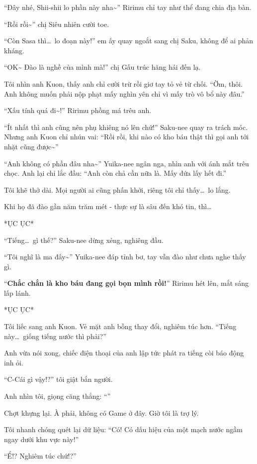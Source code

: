 \documentclass[../main.tex]{subfiles}
\begin{document}
``Đây nhé, Shii-shii lo phần này nha\~{}'' Ririmu chỉ tay như thể đang chia địa bàn.

``Rồi rồi\~{}'' chị Siêu nhiên cười toe.

``Còn Sasa thì\dots\ lo đoạn này!'' em ấy quay ngoắt sang chị Saku, không để ai phản kháng.

``OK\~{} Đào là nghề của mình mà!'' chị Gấu trúc hăng hái đến lạ.

Tôi nhìn anh Kuon, thấy anh chỉ cười trừ rồi giơ tay tỏ vẻ từ chối. ``Ờm, thôi. Anh không muốn phải nộp phạt mấy nghìn yên chỉ vì mấy trò vô bổ này đâu.''

``Xấu tính quá đi\~{}!'' Ririmu phồng má trêu anh.

``Ít nhất thì anh cũng nên phụ khiêng nó lên chứ!'' Saku-nee quay ra trách móc. Nhưng anh Kuon chỉ nhún vai: ``Rồi rồi, khi nào có kho báu thật thì gọi anh tới nhặt cũng được\~{}''

``Anh không có phần đâu nha\~{}'' Yuika-nee ngân nga, nhìn anh với ánh mắt trêu chọc. Anh lại chỉ lắc đầu: ``Anh còn chả cần nữa là. Mấy đứa lấy hết đi.''

Tôi khẽ thở dài. Mọi người ai cũng phấn khởi, riêng tôi chỉ thấy\dots\ lo lắng.

Khi họ đã đào gần năm trăm mét - thực sự là sâu đến khó tin, thì\dots

*ỤC ỤC*

``Tiếng\dots\ gì thế?'' Saku-nee dừng xẻng, nghiêng đầu.

``Tôi nghĩ là ma đấy\~{}'' Yuika-nee đáp tỉnh bơ, tay vẫn đào như chưa nghe thấy gì.

``\textbf{Chắc chắn là kho báu đang gọi bọn mình rồi!}'' Ririmu hét lên, mắt sáng lấp lánh.

*ỤC ỤC*

Tôi liếc sang anh Kuon. Vẻ mặt anh bỗng thay đổi, nghiêm túc hơn. ``Tiếng này\dots\ giống tiếng nước thì phải?''

Anh vừa nói xong, chiếc điện thoại của anh lập tức phát ra tiếng còi báo động inh ỏi.

``C-Cái gì vậy!?'' tôi giật bắn người.

Anh nhìn tôi, giọng căng thẳng: ``''

Chợt khựng lại. À phải, không có Game ở đây. Giờ tôi là trợ lý.

Tôi nhanh chóng quét lại dữ liệu: ``Có! Có dấu hiệu của một mạch nước ngầm ngay dưới khu vực này!''

``Ể!? Nghiêm túc chứ!?''
\end{document}
